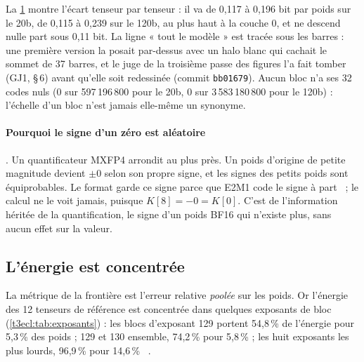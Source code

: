 \begin{figure}[tbp]
\centering
\GrapheEclZeros
{}
\label{fig:t3-ecl-zeros}
\end{figure}

La \cref{fig:t3-ecl-zeros} montre l'écart tenseur par tenseur : il va de 0,117 à 0,196 bit par poids sur le 20b, de 0,115 à 0,239 sur le 120b, au plus haut à la couche 0, et ne descend nulle part sous 0,11 bit. La ligne « tout le modèle » est tracée sous les barres : une première version la posait par-dessus avec un halo blanc qui cachait le sommet de 37 barres, et le juge de la troisième passe des figures l'a fait tomber (GJ1,  §\,6) avant qu'elle soit redessinée (commit \texttt{bb01679}). Aucun bloc n'a ses 32 codes nuls (0 sur 597\,196\,800 pour le 20b, 0 sur 3\,583\,180\,800 pour le 120b) : l'échelle d'un bloc n'est jamais elle-même un synonyme.

\paragraph{Pourquoi le signe d'un zéro est aléatoire} \calc. Un quantificateur MXFP4 arrondit au plus près. Un poids d'origine de petite magnitude devient $\pm0$ selon son propre signe, et les signes des petits poids sont équiprobables. Le format garde ce signe parce que E2M1 code le signe à part~\cite{ocpmx2023} ; le calcul ne le voit jamais, puisque $K[8] = -0 = K[0]$. C'est de l'information héritée de la quantification, le signe d'un poids BF16 qui n'existe plus, sans aucun effet sur la valeur.

\subsection{L'énergie est concentrée}

La métrique de la frontière est l'erreur relative \emph{poolée} sur les poids. Or l'énergie des 12 tenseurs de référence est concentrée dans quelques exposants de bloc (\cref{t3ecl:tab:exposants}) : les blocs d'exposant 129 portent 54,8\,\% de l'énergie pour 5,3\,\% des poids ; 129 et 130 ensemble, 74,2\,\% pour 5,8\,\% ; les huit exposants les plus lourds, 96,9\,\% pour 14,6\,\% \mes~\calc.

